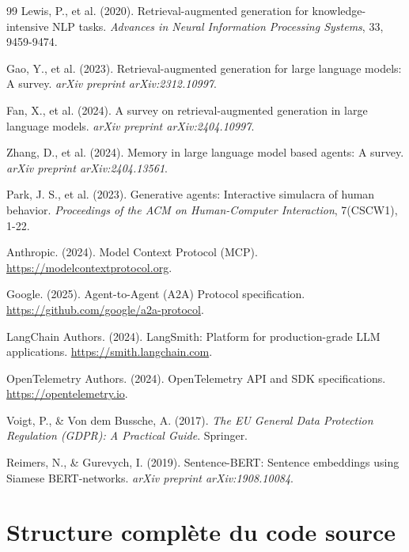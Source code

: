 \documentclass[12pt, a4paper]{article}
\begin{document}
\begin{thebibliography}{99}
Lewis, P., et al. (2020). Retrieval-augmented generation for knowledge-intensive NLP tasks. \textit{Advances in Neural Information Processing Systems}, 33, 9459-9474.

Gao, Y., et al. (2023). Retrieval-augmented generation for large language models: A survey. \textit{arXiv preprint arXiv:2312.10997}.

Fan, X., et al. (2024). A survey on retrieval-augmented generation in large language models. \textit{arXiv preprint arXiv:2404.10997}.

Zhang, D., et al. (2024). Memory in large language model based agents: A survey. \textit{arXiv preprint arXiv:2404.13561}.

Park, J. S., et al. (2023). Generative agents: Interactive simulacra of human behavior. \textit{Proceedings of the ACM on Human-Computer Interaction}, 7(CSCW1), 1-22.

Anthropic. (2024). Model Context Protocol (MCP). \url{https://modelcontextprotocol.org}.

Google. (2025). Agent-to-Agent (A2A) Protocol specification. \url{https://github.com/google/a2a-protocol}.

LangChain Authors. (2024). LangSmith: Platform for production-grade LLM applications. \url{https://smith.langchain.com}.

OpenTelemetry Authors. (2024). OpenTelemetry API and SDK specifications. \url{https://opentelemetry.io}.

Voigt, P., \& Von dem Bussche, A. (2017). \textit{The EU General Data Protection Regulation (GDPR): A Practical Guide}. Springer.

Reimers, N., \& Gurevych, I. (2019). Sentence-BERT: Sentence embeddings using Siamese BERT-networks. \textit{arXiv preprint arXiv:1908.10084}.
\end{thebibliography}


\appendix

\section{Structure complète du code source}
\label{app:code_structure}
\end{document}
